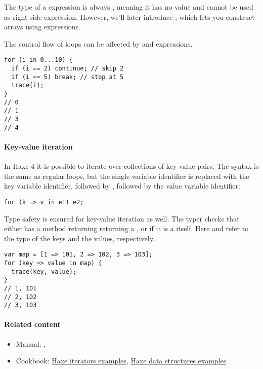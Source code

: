 The type of a  expression is always , meaning it has no value and cannot be used as right-side expression. However, we'll later introduce , which lets you construct arrays using  expressions.

The control flow of loops can be affected by  and  expressions.

\begin{lstlisting}
for (i in 0...10) {
  if (i == 2) continue; // skip 2
  if (i == 5) break; // stop at 5
  trace(i);
}
// 0
// 1
// 3
// 4
\end{lstlisting}


\paragraph{Key-value iteration}
\label{expression-for-keyvalue}

In Haxe 4 it is possible to iterate over collections of key-value pairs. The syntax is the same as regular  loops, but the single variable identifier is replaced with the key variable identifier, followed by \expr{=>}, followed by the value variable identifier:

\begin{lstlisting}
for (k => v in e1) e2;
\end{lstlisting}

Type safety is ensured for key-value iteration as well. The typer checks that  either has a  method returning returning a , or if it is a  itself. Here  and  refer to the type of the keys and the values, respectively.

\begin{lstlisting}
var map = [1 => 101, 2 => 102, 3 => 103];
for (key => value in map) {
  trace(key, value);
}
// 1, 101
// 2, 102
// 3, 103
\end{lstlisting}

\paragraph{Related content}
\begin{itemize}
	\item Manual: , 
	\item Cookbook: \href{http://code.haxe.org/tag/iterator.html}{Haxe iterators examples}, \href{http://code.haxe.org/tag/data-structures.html}{Haxe data structures examples}
\end{itemize}

